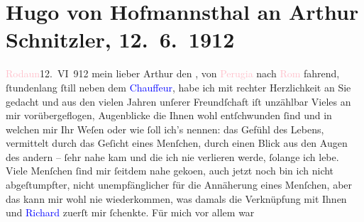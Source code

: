 

               \section[Hugo von Hofmannsthal an Arthur Schnitzler, 12. 6. 1912]{ Hugo von Hofmannsthal an Arthur Schnitzler, 12. 6. 1912}\nopagebreak{}\rehead{ }\normalsize\beginnumbering{} \toendnotes[C]{\smallbreak\pagebreak[2]} 
\toendnotes[C]{\smallbreak}\pstart
           \raggedleft{}{\pb}\textcolor{pink}{Rodaun}{}\ledrightnote{\textcolor{pink}{Rodaun}}{ }12. VI 912\pend
           \pstart{}mein lieber Arthur\pend\pstart
           den \label{K_L02074_1v}\label{K_L02074_1h}, von \textcolor{pink}{Perugia}{}\ledrightnote{\textcolor{pink}{Perugia}} nach \textcolor{pink}{Rom}{}\ledrightnote{\textcolor{pink}{Rom}}
               fahrend, ſtundenlang ſtill neben dem \textcolor{blue}{Chauffeur}{}, habe ich mit rechter Herzlichkeit an Sie gedacht und aus den
               vielen Jahren unſerer Freundſchaft iſt unzählbar Vieles an mir vorübergeflogen,
               Augenblicke die Ihnen wohl entſchwunden ſind und in welchen mir Ihr Weſen oder wie
               ſoll ich’s nennen: das Gefühl des Lebens, vermittelt durch das Geſicht eines
               Menſchen, durch einen Blick aus den Augen des andern – ſehr nahe kam und die ich nie
               verlieren werde, ſolange ich lebe. Viele Menſchen ſind mir ſeitdem nahe geko{\geminationm}en, auch jetzt noch bin ich nicht abgeſtumpfter, nicht
               unempfänglicher für die Annäherung eines Menſchen, aber das kann mir wohl nie
               wiederkommen, was damals die Verknüpfung mit Ihnen und \textcolor{blue}{Richard}{}\ledrightnote{\textcolor{blue}{Richard Beer-Hofmann}} zuerſt mir ſchenkte. Für mich \introOben{}vor allem\introOben{} war
